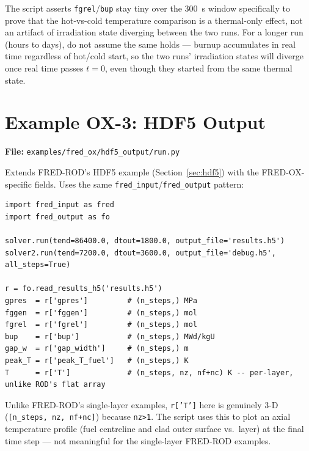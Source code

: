 \documentclass[11pt,a4paper]{article}
\begin{document}
\begin{warningbox}
  The script asserts \texttt{fgrel}/\texttt{bup} stay tiny over the 300~s
  window specifically to prove that the hot-vs-cold temperature comparison
  is a thermal-only effect, not an artifact of irradiation state diverging
  between the two runs.  For a longer run (hours to days), do not assume the
  same holds --- burnup accumulates in real time regardless of hot/cold
  start, so the two runs' irradiation states will diverge once real time
  passes $t=0$, even though they started from the same thermal state.
\end{warningbox}

\section{Example OX-3: HDF5 Output}
\label{sec:ox-hdf5}

\textbf{File:} \texttt{examples/fred\_ox/hdf5\_output/run.py}

\medskip
Extends FRED-ROD's HDF5 example (Section~\ref{sec:hdf5}) with the
FRED-OX-specific fields.  Uses the same \texttt{fred\_input}/\texttt{fred\_output}
pattern:

\begin{lstlisting}
import fred_input as fred
import fred_output as fo

solver.run(tend=86400.0, dtout=1800.0, output_file='results.h5')
solver2.run(tend=7200.0, dtout=3600.0, output_file='debug.h5', all_steps=True)

r = fo.read_results_h5('results.h5')
gpres  = r['gpres']         # (n_steps,) MPa
fggen  = r['fggen']         # (n_steps,) mol
fgrel  = r['fgrel']         # (n_steps,) mol
bup    = r['bup']           # (n_steps,) MWd/kgU
gap_w  = r['gap_width']     # (n_steps,) m
peak_T = r['peak_T_fuel']   # (n_steps,) K
T      = r['T']             # (n_steps, nz, nf+nc) K -- per-layer, unlike ROD's flat array
\end{lstlisting}

\begin{warningbox}
  Unlike FRED-ROD's single-layer examples, \texttt{r['T']} here is
  genuinely 3-D (\texttt{[n\_steps, nz, nf+nc]}) because \texttt{nz>1}.
  The script uses this to plot an axial temperature profile (fuel
  centreline and clad outer surface vs.\ layer) at the final time step ---
  not meaningful for the single-layer FRED-ROD examples.
\end{warningbox}
\end{document}
